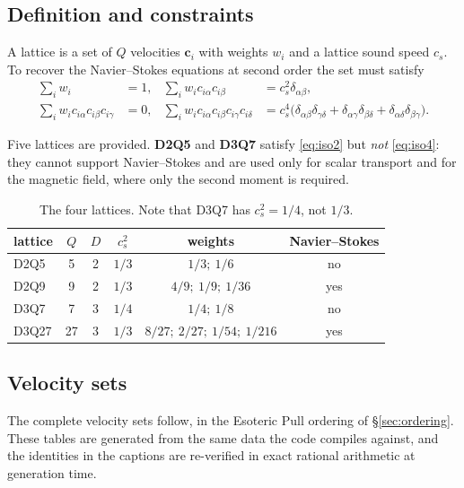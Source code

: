 \documentclass[11pt,a4paper]{article}
\newcommand{\cs}{c_s}
\newcommand{\ci}{\bm{c}_i}
\begin{document}
\subsection{Definition and constraints}

A lattice is a set of $Q$ velocities $\ci$ with weights $w_i$ and a lattice sound
speed $\cs$. To recover the Navier--Stokes equations at second order the set must
satisfy
\begin{align}
  \textstyle\sum_i w_i &= 1, &
  \textstyle\sum_i w_i c_{i\alpha} c_{i\beta} &= \cs^2\delta_{\alpha\beta},
  \label{eq:iso2}\\
  \textstyle\sum_i w_i c_{i\alpha} c_{i\beta} c_{i\gamma} &= 0, &
  \textstyle\sum_i w_i c_{i\alpha} c_{i\beta} c_{i\gamma} c_{i\delta}
    &= \cs^4\big(\delta_{\alpha\beta}\delta_{\gamma\delta}
      + \delta_{\alpha\gamma}\delta_{\beta\delta}
      + \delta_{\alpha\delta}\delta_{\beta\gamma}\big).
  \label{eq:iso4}
\end{align}

Five lattices are provided. \textbf{D2Q5} and \textbf{D3Q7} satisfy
\eqref{eq:iso2} but \emph{not} \eqref{eq:iso4}: they cannot support
Navier--Stokes and are used only for scalar transport and for the magnetic field,
where only the second moment is required.

\begin{table}[h]
\centering\small
\begin{tabular}{lccccc}
\toprule
lattice & $Q$ & $D$ & $\cs^2$ & weights & Navier--Stokes \\
\midrule
D2Q5  & 5  & 2 & $1/3$ & $1/3;\ 1/6$ & no \\
D2Q9  & 9  & 2 & $1/3$ & $4/9;\ 1/9;\ 1/36$ & yes \\
D3Q7  & 7  & 3 & $1/4$ & $1/4;\ 1/8$ & no \\
D3Q27 & 27 & 3 & $1/3$ & $8/27;\ 2/27;\ 1/54;\ 1/216$ & yes \\
\bottomrule
\end{tabular}
\caption{The four lattices. Note that D3Q7 has $\cs^2=1/4$, not $1/3$.}
\end{table}

\subsection{Velocity sets}
\label{sec:velsets}

The complete velocity sets follow, in the Esoteric Pull ordering of
\S\ref{sec:ordering}. These tables are generated from the same data the code
compiles against, and the identities in the captions are re-verified in exact
rational arithmetic at generation time.
\end{document}
